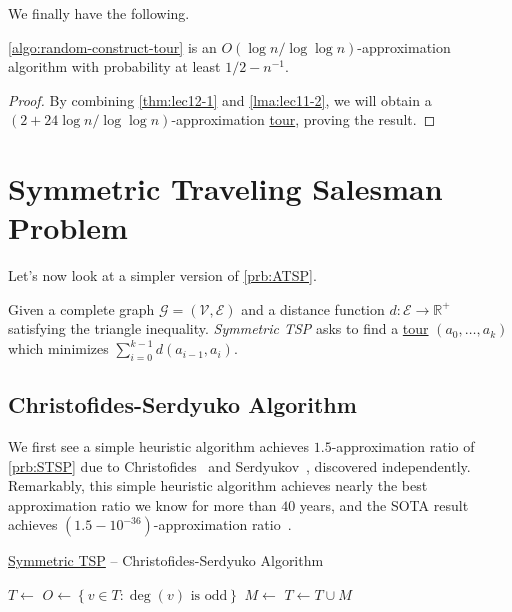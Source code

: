 We finally have the following.

\begin{theorem}
	\autoref{algo:random-construct-tour} is an \(O(\log n / \log \log n)\)-approximation algorithm with probability at least \(1 / 2 - n ^{-1} \).
\end{theorem}
\begin{proof}
	By combining \autoref{thm:lec12-1} and \autoref{lma:lec11-2}, we will obtain a \((2 + 24\log n / \log \log n)\)-approximation \hyperref[def:tour]{tour}, proving the result.
\end{proof}


\section{Symmetric Traveling Salesman Problem}
Let's now look at a simpler version of \autoref{prb:ATSP}.

\begin{problem}\label{prb:STSP}
Given a complete graph \(\mathcal{G} =(\mathcal{V} , \mathcal{E} )\) and a distance function \(d\colon \mathcal{E} \to \mathbb{R} ^+\) satisfying the triangle inequality. \emph{Symmetric TSP} asks to find a \hyperref[def:tour]{tour} \((a_0, \dots , a_k)\) which minimizes \(\sum_{i=0} ^{k-1}d(a_{i-1}, a_i)\).
\end{problem}

\subsection{Christofides-Serdyuko Algorithm}
We first see a simple heuristic algorithm achieves \(1.5\)-approximation ratio of \autoref{prb:STSP} due to Christofides~\cite{Christofides2022WorstCaseAO} and Serdyukov~\cite{Anatoliy}, discovered independently. Remarkably, this simple heuristic algorithm achieves nearly the best approximation ratio we know for more than \(40\) years, and the SOTA result achieves \((1.5-10^{-36})\)-approximation ratio~\cite{10.1145/3406325.3451009}.

\begin{algorithm}[H]\label{algo:Christofides-Serdyuko}
	\DontPrintSemicolon
	\caption{\hyperref[prb:STSP]{Symmetric TSP} -- Christofides-Serdyuko Algorithm~\cite{Christofides2022WorstCaseAO,Anatoliy}}
	\BlankLine
	\(T \gets\)\label{algo:Christofides-Serdyuko-linea1}
	\(O\gets \left\{ v\in T \colon \deg(v)\text{ is odd}\right\} \)\label{algo:Christofides-Serdyuko-linea2}\;
	\(M\gets\)\label{algo:Christofides-Serdyuko-linea3}
	\(T\gets T \cup M\)\;
	\;
\end{algorithm}

